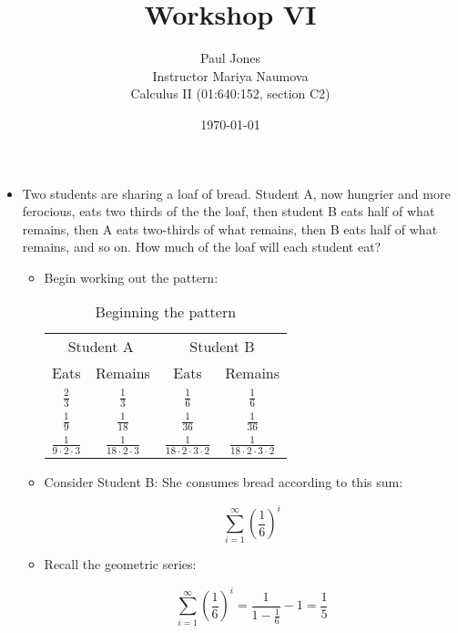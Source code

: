 \documentclass[11pt]{article}
\title{Workshop VI}
\author{Paul Jones \\
		Instructor Mariya Naumova\\
		Calculus II (01:640:152, section C2)}
\date{\today}
\begin{document}
\maketitle

\pagebreak

\begin{itemize}

\item Two students are sharing a loaf of bread. Student A, now hungrier and more
ferocious, eats two thirds of the the loaf, then student B eats half of what
remains, then A eats two-thirds of what remains, then B eats half of what remains,
and so on. How much of the loaf will each student eat?

\begin{itemize}

	\item Begin working out the pattern:

	\begin{table}[h]
		\begin{center}
			\caption{Beginning the pattern}
				\begin{tabular}{|c c|c c|}
				\hline
				\multicolumn{2}{|c|}{Student A} & \multicolumn{2}{|c|}{Student B} \\
				Eats & Remains & Eats & Remains \\\hline
				$\frac{2}{3}$ & $\frac{1}{3}$ & $\frac{1}{6}$ & $\frac{1}{6}$ \\\hline
				$\frac{1}{9}$ & $\frac{1}{18}$ & $\frac{1}{36}$ & $\frac{1}{36}$ \\\hline
				$\frac{1}{9 \cdot 2 \cdot 3}$ & $\frac{1}{18 \cdot 2 \cdot 3}$ & $\frac{1}{18 \cdot 2 \cdot 3 \cdot 2}$ & $\frac{1}{18 \cdot 2 \cdot 3 \cdot 2}$ \\
				\hline
				\end{tabular}
			\label{ }
		\end{center}
	\end{table}
	
	\item Consider Student B: She consumes bread according to this sum:
	
	\begin{equation*}
	\sum_{i=1}^{\infty}\left(\frac{1}{6}\right)^i
	\end{equation*}
	
	\item Recall the geometric series:
	
	\begin{equation*}
	\sum_{i=1}^{\infty}\left(\frac{1}{6}\right)^i = \frac{1}{1 - \frac{1}{6}} - 1 = \frac{1}{5}
	\end{equation*}
	

\end{itemize}
\end{itemize}
\end{document}

